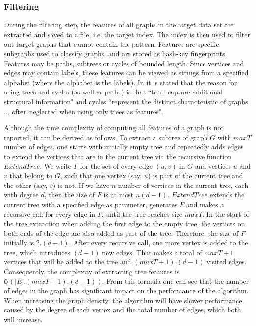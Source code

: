 \documentclass{l4proj}
\begin{document}
\subsubsection{Filtering}
During the filtering step, the features of all graphs in the target data set are extracted and saved to a file, i.e. the target index. The index is then used to filter out target graphs that cannot contain the pattern.  Features are specific subgraphs used to classify graphs, and are stored as hash-key fingerprints. Features may be paths, subtrees or cycles of bounded length. Since vertices and edges may contain labels, these features can be viewed as strings from a specified alphabet (where the alphabet is the labels). In \cite{ctindex} it is stated that the reason for using trees and cycles (as well as paths) is that ``trees capture additional structural information" and cycles ``represent the distinct characteristic of graphs ... often neglected when using only trees as features".

%
%
Although the time complexity of computing all features of a graph is not reported, it can be derived as follows. To extract a subtree of graph $G$ with $maxT$ number of edges, one starts with initially empty tree and repeatedly adds edges to extend the vertices that are in the current tree via the recursive function $ExtendTree$. We write $F$ for the set of every edge $(u,v)$ in $G$ and vertices $u$ and $v$ that belong to $G$, such that one vertex (say, $u$) is part of the current tree and the other (say, $v$) is not. If we have $n$ number of vertices in the current tree, each with degree $d$, then the size of $F$ is at most $n(d-1)$. $ExtendTree$ extends the current tree with a specified edge as parameter, generates $F$ and makes a recursive call for every edge in $F$, until the tree reaches size $maxT$.
In the start of the tree extraction when adding the first edge to the empty tree, the vertices on both ends of the edge are also added as part of the tree. Therefore, the size of $F$ initially is $2.(d-1)$. After every recursive call, one more vertex is added to the tree, which introduces $(d-1)$ new edges. That makes a total of $maxT+1$ vertices that will be added to the tree and $(maxT+1).(d-1)$ visited edges. Consequently, the complexity of extracting tree features is $\mathcal{O}(|E|.(maxT+1).(d-1))$. From this formula one can see that the number of edges in the graph has significant impact on the performance of the algorithm. When increasing the graph density, the algorithm will have slower performance, caused by the degree of each vertex and the total number of edges, which both will increase.
\end{document}
